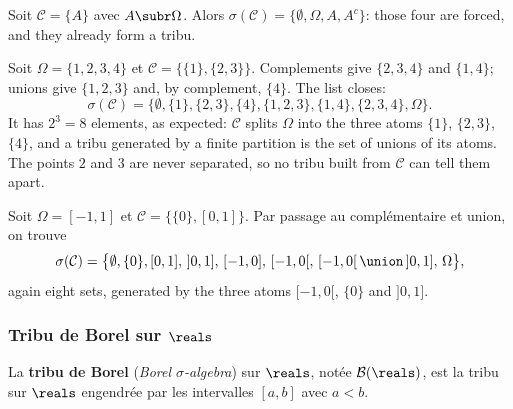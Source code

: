 \begin{example}
  Soit $\mathcal{C} = \{A\}$ avec $A \subr \Omega$. Alors $\sigma(\mathcal{C}) =
  \{\emptyset, \Omega, A, A^{c}\}$: those four are forced, and they already form a
  tribu.
\end{example}

\begin{example}
  Soit $\Omega = \{1,2,3,4\}$ et $\mathcal{C} = \{\{1\},\{2,3\}\}$. Complements give
  $\{2,3,4\}$ and $\{1,4\}$; unions give $\{1,2,3\}$ and, by complement, $\{4\}$.
  The list closes:
  \[
    \sigma(\mathcal{C}) = \bigl\{\emptyset, \{1\}, \{2,3\}, \{4\}, \{1,2,3\},
    \{1,4\}, \{2,3,4\}, \Omega\bigr\}.
  \]
  It has $2^{3} = 8$ elements, as expected: $\mathcal{C}$ splits $\Omega$ into the
  three atoms $\{1\}$, $\{2,3\}$, $\{4\}$, and a tribu generated by a finite
  partition is the set of unions of its atoms. The points $2$ and $3$ are never
  separated, so no tribu built from $\mathcal{C}$ can tell them apart.
\end{example}

\begin{example}
  Soit $\Omega = [-1,1]$ et $\mathcal{C} = \{\{0\},[0,1]\}$. Par passage au
  complémentaire et union, on trouve
  \[
    \sigma(\mathcal{C}) = \bigl\{\emptyset, \{0\}, [0,1], \,]0,1], \,[-1,0],
    \,[-1,0[, \,[-1,0[ \,\union\, ]0,1], \,\Omega\bigr\},
  \]
  again eight sets, generated by the three atoms $[-1,0[$, $\{0\}$ and $]0,1]$.
\end{example}

\subsubsection{Tribu de Borel sur $\reals$}

\begin{definition}
  La \textbf{tribu de Borel} (\textit{Borel $\sigma$-algebra}) sur $\reals$, notée
  $\mathcal{B}(\reals)$, est la tribu sur $\reals$ engendrée par les intervalles
  $[a,b]$ avec $a < b$.
\end{definition}


